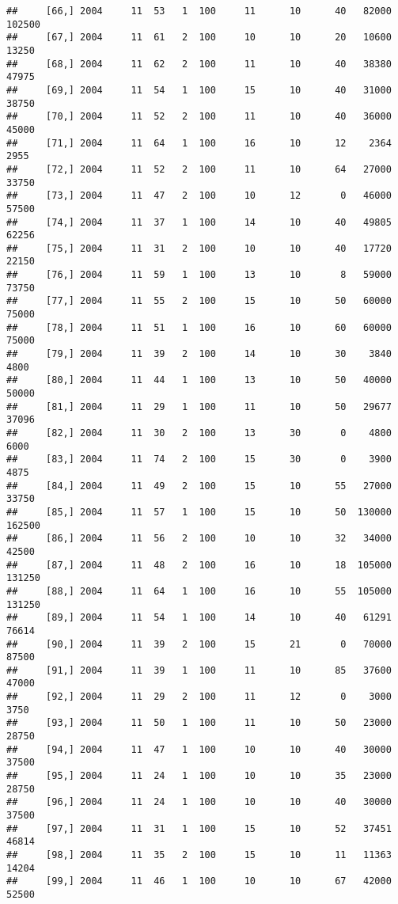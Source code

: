 \documentclass{article}\usepackage[]{graphicx}\usepackage[]{color}
\makeatletter
\newenvironment{kframe}{%
 \def\at@end@of@kframe{}%
 \ifinner\ifhmode%
  \def\at@end@of@kframe{\end{minipage}}%
  \begin{minipage}{\columnwidth}%
 \fi\fi%
 \def\FrameCommand##1{\hskip\@totalleftmargin \hskip-\fboxsep
 \colorbox{shadecolor}{##1}\hskip-\fboxsep
     \hskip-\linewidth \hskip-\@totalleftmargin \hskip\columnwidth}%
 \MakeFramed {\advance\hsize-\width
   \@totalleftmargin\z@ \linewidth\hsize
   \@setminipage}}%
 {\par\unskip\endMakeFramed%
 \at@end@of@kframe}
\newenvironment{knitrout}{}{} %
\makeatother
\begin{document}
\begin{knitrout}
\begin{kframe}
\begin{verbatim}
##     [66,] 2004     11  53   1  100     11      10      40   82000  102500
##     [67,] 2004     11  61   2  100     10      10      20   10600   13250
##     [68,] 2004     11  62   2  100     11      10      40   38380   47975
##     [69,] 2004     11  54   1  100     15      10      40   31000   38750
##     [70,] 2004     11  52   2  100     11      10      40   36000   45000
##     [71,] 2004     11  64   1  100     16      10      12    2364    2955
##     [72,] 2004     11  52   2  100     11      10      64   27000   33750
##     [73,] 2004     11  47   2  100     10      12       0   46000   57500
##     [74,] 2004     11  37   1  100     14      10      40   49805   62256
##     [75,] 2004     11  31   2  100     10      10      40   17720   22150
##     [76,] 2004     11  59   1  100     13      10       8   59000   73750
##     [77,] 2004     11  55   2  100     15      10      50   60000   75000
##     [78,] 2004     11  51   1  100     16      10      60   60000   75000
##     [79,] 2004     11  39   2  100     14      10      30    3840    4800
##     [80,] 2004     11  44   1  100     13      10      50   40000   50000
##     [81,] 2004     11  29   1  100     11      10      50   29677   37096
##     [82,] 2004     11  30   2  100     13      30       0    4800    6000
##     [83,] 2004     11  74   2  100     15      30       0    3900    4875
##     [84,] 2004     11  49   2  100     15      10      55   27000   33750
##     [85,] 2004     11  57   1  100     15      10      50  130000  162500
##     [86,] 2004     11  56   2  100     10      10      32   34000   42500
##     [87,] 2004     11  48   2  100     16      10      18  105000  131250
##     [88,] 2004     11  64   1  100     16      10      55  105000  131250
##     [89,] 2004     11  54   1  100     14      10      40   61291   76614
##     [90,] 2004     11  39   2  100     15      21       0   70000   87500
##     [91,] 2004     11  39   1  100     11      10      85   37600   47000
##     [92,] 2004     11  29   2  100     11      12       0    3000    3750
##     [93,] 2004     11  50   1  100     11      10      50   23000   28750
##     [94,] 2004     11  47   1  100     10      10      40   30000   37500
##     [95,] 2004     11  24   1  100     10      10      35   23000   28750
##     [96,] 2004     11  24   1  100     10      10      40   30000   37500
##     [97,] 2004     11  31   1  100     15      10      52   37451   46814
##     [98,] 2004     11  35   2  100     15      10      11   11363   14204
##     [99,] 2004     11  46   1  100     10      10      67   42000   52500

\end{verbatim}
\end{kframe}
\end{knitrout}
\end{document}
